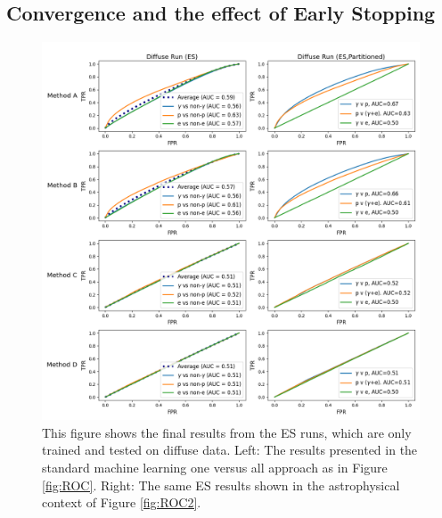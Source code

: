 \subsection{Convergence and the effect of Early Stopping}
\begin{figure}
  \centering
  \includegraphics[width=\textwidth]{figures/esplot.png}
  \caption{This figure shows the final results from the ES runs, which are only trained and tested on diffuse data. Left: The results presented in the standard machine learning one versus all approach as in Figure \ref{fig:ROC}. Right: The same ES results shown in the astrophysical context of Figure \ref{fig:ROC2}.
  }
  \label{fig:ROC3}
\end{figure}

